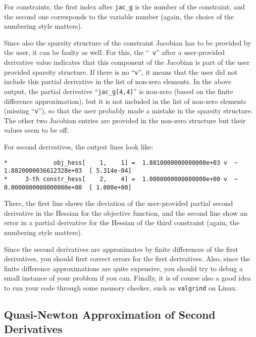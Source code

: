 \documentclass[10pt]{article}
\begin{document}
For constraints, the first index after {\tt jac\_g} is the number of
the constraint, and the second one corresponds to the variable number
(again, the choice of the numbering style matters).

Since also the sparsity structure of the constraint Jacobian has to be
provided by the user, it can be faulty as well.  For this, the ``{\tt
  v}'' after a user-provided derivative value indicates that this
component of the Jacobian is part of the user provided sparsity
structure.  If there is no ``{\tt v}'', it means that the user did not
include this partial derivative in the list of non-zero elements.  In
the above output, the partial derivative ``{\tt jac\_g[4,4]}'' is
non-zero (based on the finite difference approximation), but it is not
included in the list of non-zero elements (missing ``{\tt v}''), so
that the user probably made a mistake in the sparsity structure.  The
other two Jacobian entries are provided in the non-zero structure but
their values seem to be off.

For second derivatives, the output lines look like:

\begin{footnotesize}
\begin{verbatim}
*             obj_hess[    1,    1] =  1.8810000000000000e+03 v  ~  1.8820000036612328e+03  [ 5.314e-04]
*     3-th constr_hess[    2,    4] =  1.0000000000000000e+00 v  ~  0.0000000000000000e+00  [ 1.000e+00]
\end{verbatim}
\end{footnotesize}

There, the first line shows the deviation of the user-provided partial
second derivative in the Hessian for the objective function, and the
second line show an error in a partial derivative for the Hessian of
the third constraint (again, the numbering style matters).

Since the second derivatives are approximates by finite differences of
the first derivatives, you should first correct errors for the first
derivatives.  Also, since the finite difference approximations are
quite expensive, you should try to debug a small instance of your
problem if you can.  Finally, it is of course also a good idea to run
your code through some memory checker, such as {\tt valgrind} on Linux.

\subsection{Quasi-Newton Approximation of Second Derivatives}
\label{sec:quasiNewton}
\end{document}
